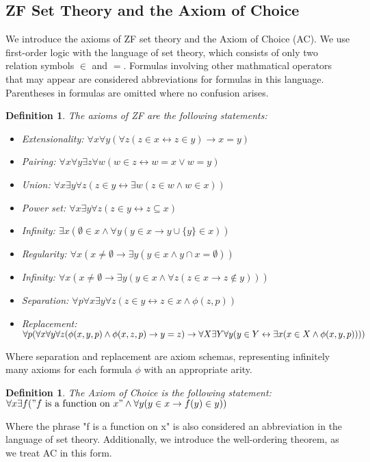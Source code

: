\documentclass{report}
\newtheorem{dfn}[thm]{Definition}
\begin{document}
\subsection{ZF Set Theory and the Axiom of Choice}
We introduce the axioms of ZF set theory and the Axiom of Choice (AC).
We use first-order logic with the language of set theory, which consists of only two relation symbols $\in$ and $=$. 
Formulas involving other mathmatical operators that may appear are considered abbreviations for formulas in this language.
Parentheses in formulas are omitted where no confusion arises.

\begin{dfn}
  The axioms of ZF are the following statements:
  \begin{itemize}
    \item Extensionality: $\forall x \forall y (\forall z (z \in x \leftrightarrow z \in y) \rightarrow x = y)$
    \item Pairing: $\forall x \forall y \exists z \forall w (w \in z \leftrightarrow w = x \lor w = y)$
    \item Union: $\forall x \exists y \forall z (z \in y \leftrightarrow \exists w (z \in w \land w \in x))$
    \item Power set: $\forall x \exists y \forall z (z \in y \leftrightarrow z \subseteq x)$
    \item Infinity: $\exists x (\emptyset \in x \land \forall y (y \in x \rightarrow y \cup \{y\} \in x))$
    \item Regularity: $\forall x(x \neq \emptyset \rightarrow \exists y (y \in x \land y \cap x = \emptyset))$
    \item Infinity: $\forall x (x \neq \emptyset \rightarrow \exists y (y \in x \land \forall z (z \in x \rightarrow z \notin y)))$
    \item Separation: $\forall p \forall x \exists y \forall z (z \in y \leftrightarrow z \in x \land \phi(z, p))$
    \item Replacement: $\forall p (\forall x \forall y \forall z (\phi(x, y, p) \land \phi(x, z, p) \rightarrow y = z) \rightarrow \\ \forall X \exists Y \forall y (y \in Y \leftrightarrow \exists x (x \in X \land \phi(x, y, p))))$
  \end{itemize}
\end{dfn}
Where separation and replacement are axiom schemas, representing infinitely many axioms for each formula $\phi$ with an appropriate arity.
\begin{dfn} 
  \emph{The Axiom of Choice} is the following statement: \\
  $\forall x \exists f (\mathrm{"} f \text{ is a function on } x \mathrm{"} \land \forall y (y \in x \rightarrow f(y) \in y))$
\end{dfn}
Where the phrase "f is a function on x" is also considered an abbreviation in the language of set theory.
Additionally, we introduce the well-ordering theorem, as we treat AC in this form.
\end{document}
